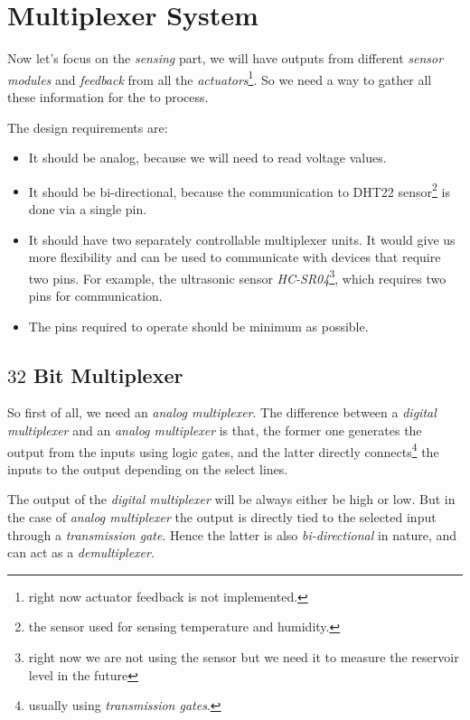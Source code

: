 \documentclass[../../main]{subfiles}
\begin{document}
\section{Multiplexer System} \label{sec:multiplexerSystem}

Now let's focus on the \emph{sensing} part, we will have outputs from different
\emph{sensor modules} and \emph{feedback} from all the \emph{actuators}\footnote{right now
actuator feedback is not implemented.}. So we need a way to gather all these information
for the \esp to process.

The design requirements are:

\begin{itemize}
    \item It should be analog, because we will need to read voltage values.
    \item It should be bi-directional, because the communication to DHT22 sensor\footnote{the
        sensor used for sensing temperature and humidity.} is done via a single pin.
    \item It should have two separately controllable multiplexer units. It would give us
        more flexibility and can be used to communicate with devices that require two
        pins. For example, the ultrasonic sensor \emph{HC-SR04}\footnote{right now we are
        not using the sensor but we need it to measure the reservoir level in the future},
        which requires two pins for communication.
    \item The pins required to operate should be minimum as possible.
\end{itemize}

\subsection{$32$ Bit Multiplexer}

So first of all, we need an \emph{analog multiplexer}. The difference between a \emph{digital
multiplexer} and an \emph{analog multiplexer} is that, the former one generates the output
from the inputs using logic gates, and the latter directly connects\footnote{usually using
\emph{transmission gates}.} the inputs to the output depending on the select lines.

The output of the \emph{digital multiplexer} will be always either be high or low. But in
the case of \emph{analog multiplexer} the output is directly tied to the selected input
through a \emph{transmission gate}. Hence the latter is also \emph{bi-directional} in nature,
and can act as a \emph{demultiplexer}.
\end{document}
